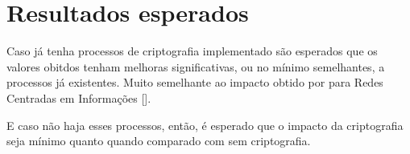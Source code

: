 \section{Resultados esperados}
\label{proposta:resultadosEsperados}
Caso já tenha processos de criptografia implementado são esperados que os valores obitdos tenham melhoras significativas, ou no mínimo semelhantes, a processos já existentes. Muito semelhante ao impacto obtido por \cite{mannes2016controle} para Redes Centradas em Informações [\cite{redesCentradasInfo}].

E caso não haja esses processos, então, é esperado que o impacto da criptografia seja mínimo quanto quando comparado com sem criptografia. 